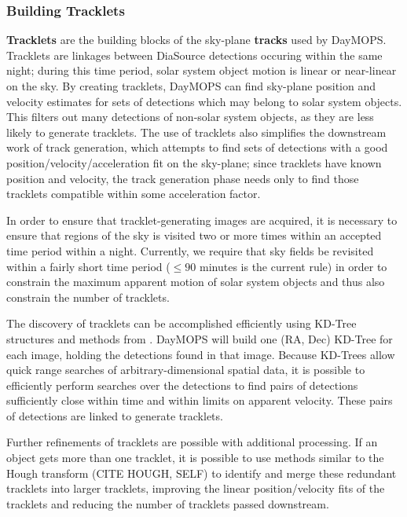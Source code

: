 \documentclass[12pt,preprint]{aastex}
\begin{document}
\subsubsection{Building Tracklets}


\textbf{Tracklets} are the building blocks of the sky-plane
\textbf{tracks} used by DayMOPS.  Tracklets are linkages between
DiaSource detections occuring within the same night; during this time
period, solar system object motion is linear or near-linear on the
sky. By creating tracklets, DayMOPS can find sky-plane position and
velocity estimates for sets of detections which may belong to solar
system objects.  This filters out many detections of non-solar system
objects, as they are less likely to generate tracklets.  The use of
tracklets also simplifies the downstream work of track generation,
which attempts to find sets of detections with a good
position/velocity/acceleration fit on the sky-plane; since tracklets
have known position and velocity, the track generation phase needs
only to find those tracklets compatible within some acceleration
factor.

In order to ensure that tracklet-generating images are acquired, it is
necessary to ensure that regions of the sky is visited two or more
times within an accepted time period within a night.  Currently, we
require that sky fields be revisited within a fairly short time period
($\leq 90$ minutes is the current rule) in order to constrain the
maximum apparent motion of solar system objects and thus also
constrain the number of tracklets.

The discovery of tracklets can be accomplished efficiently using
KD-Tree structures \citep{bentley_kdtrees} and methods from
\citet{kubica_thesis}.  DayMOPS will build one (RA, Dec) KD-Tree for
each image, holding the detections found in that image.  Because
KD-Trees allow quick range searches of arbitrary-dimensional spatial
data, it is possible to efficiently perform searches over the
detections to find pairs of detections sufficiently close within time
and within limits on apparent velocity. These pairs of detections are
linked to generate tracklets.


Further refinements of tracklets are possible with additional
processing. If an object gets more than one tracklet, it is possible
to use methods similar to the Hough transform (CITE HOUGH, SELF) to
identify and merge these redundant tracklets into larger tracklets,
improving the linear position/velocity fits of the tracklets and
reducing the number of tracklets passed downstream.
\end{document}
